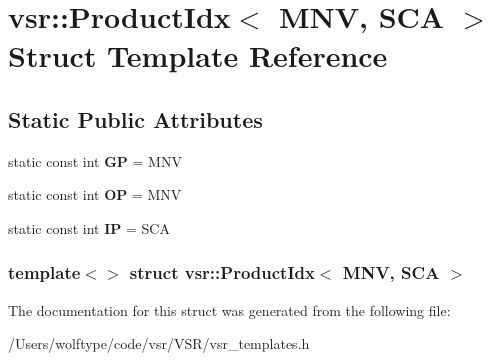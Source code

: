 \hypertarget{structvsr_1_1_product_idx_3_01_m_n_v_00_01_s_c_a_01_4}{\section{vsr\-:\-:Product\-Idx$<$ M\-N\-V, S\-C\-A $>$ Struct Template Reference}
\label{structvsr_1_1_product_idx_3_01_m_n_v_00_01_s_c_a_01_4}
}
\subsection*{Static Public Attributes}
\begin{DoxyCompactItemize}
\item 
\hypertarget{structvsr_1_1_product_idx_3_01_m_n_v_00_01_s_c_a_01_4_a3f3b5f4c38fa8ff618461cd55a6e32bf}{static const int {\bfseries G\-P} = M\-N\-V}\label{structvsr_1_1_product_idx_3_01_m_n_v_00_01_s_c_a_01_4_a3f3b5f4c38fa8ff618461cd55a6e32bf}

\item 
\hypertarget{structvsr_1_1_product_idx_3_01_m_n_v_00_01_s_c_a_01_4_a2e5e99ac7839c56cafef50d94d196590}{static const int {\bfseries O\-P} = M\-N\-V}\label{structvsr_1_1_product_idx_3_01_m_n_v_00_01_s_c_a_01_4_a2e5e99ac7839c56cafef50d94d196590}

\item 
\hypertarget{structvsr_1_1_product_idx_3_01_m_n_v_00_01_s_c_a_01_4_a33cef8b7f0c677b6ce9e32d0ae340af7}{static const int {\bfseries I\-P} = S\-C\-A}\label{structvsr_1_1_product_idx_3_01_m_n_v_00_01_s_c_a_01_4_a33cef8b7f0c677b6ce9e32d0ae340af7}

\end{DoxyCompactItemize}
\subsubsection*{template$<$$>$ struct vsr\-::\-Product\-Idx$<$ M\-N\-V, S\-C\-A $>$}



The documentation for this struct was generated from the following file\-:\begin{DoxyCompactItemize}
\item 
/\-Users/wolftype/code/vsr/\-V\-S\-R/vsr\-\_\-templates.\-h\end{DoxyCompactItemize}
